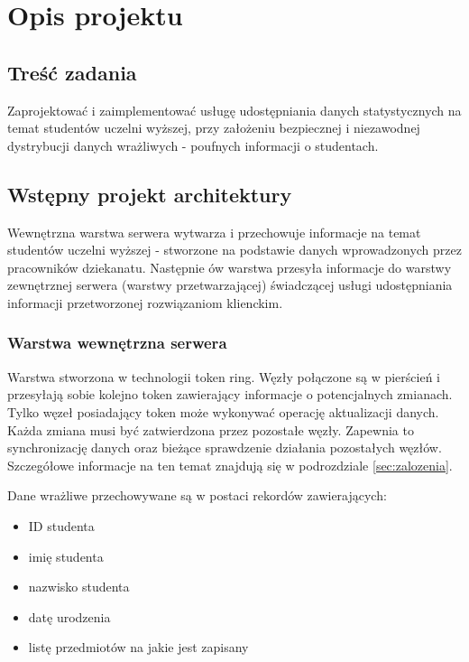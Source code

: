\chapter[Opis projektu]{Opis projektu}

\section[Treść zadania]{Treść zadania}

\par{Zaprojektować i zaimplementować usługę udostępniania danych statystycznych na temat studentów uczelni wyższej, przy założeniu bezpiecznej i niezawodnej dystrybucji danych wrażliwych - poufnych informacji o studentach.}



\section[Wstępny projekt architektury]{Wstępny projekt architektury}

\par{Wewnętrzna warstwa serwera wytwarza i przechowuje informacje na temat studentów uczelni wyższej - stworzone na podstawie danych wprowadzonych przez pracowników dziekanatu. Następnie ów warstwa przesyła informacje do warstwy zewnętrznej serwera (warstwy przetwarzającej) świadczącej usługi udostępniania informacji przetworzonej rozwiązaniom klienckim.}

\subsection*[Warstwa wewnętrzna serwera]{Warstwa wewnętrzna serwera}

\par{Warstwa stworzona w technologii token ring. Węzły połączone są w pierścień i przesyłają sobie kolejno token zawierający informacje o potencjalnych zmianach. Tylko węzeł posiadający token może wykonywać operację aktualizacji danych. Każda zmiana musi być zatwierdzona przez pozostałe węzły. Zapewnia to synchronizację danych oraz bieżące sprawdzenie działania pozostałych węzłów. Szczegółowe informacje na ten temat znajdują się w podrozdziale \ref{sec:zalozenia}.}

\par{Dane wrażliwe przechowywane są w postaci rekordów zawierających:}

\begin{itemize}
\item ID studenta
\item imię studenta
\item nazwisko studenta
\item datę urodzenia
\item listę przedmiotów na jakie jest zapisany
\end{itemize}

